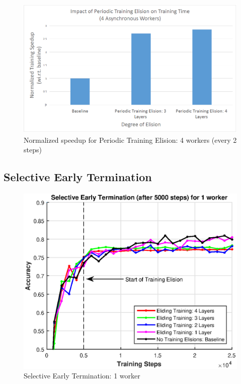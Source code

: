 \begin{figure}[t]
	\centering
	\includegraphics[width=1.0\columnwidth]{figures/fig5.PNG}
	\caption{Normalized speedup for Periodic Training Elision: 4 workers (every 2 steps)}
	\label{fig:fig5}
\end{figure}
\subsection{Selective Early Termination}
\begin{figure}[t]
	\centering
	\includegraphics[width=0.8\columnwidth]{figures/fig6.eps}
	\caption{Selective Early Termination: 1 worker}
	\label{fig:fig6}
\end{figure}

